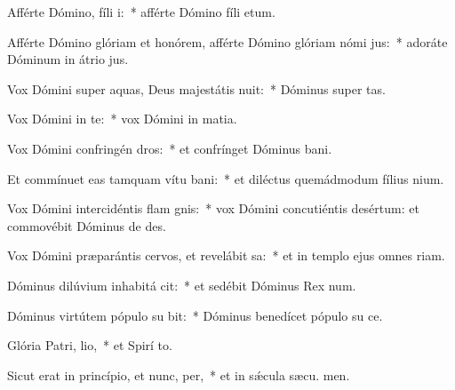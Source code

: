 \item Afférte Dómino, fíli i:~* afférte Dómino fíli etum.
\item Afférte Dómino glóriam et honórem, afférte Dómino glóriam nómi jus:~* adoráte Dóminum in átrio  jus.
\item Vox Dómini super aquas, Deus majestátis nuit:~* Dóminus super  tas.
\item Vox Dómini in te:~* vox Dómini in matia.
\item Vox Dómini confringén dros:~* et confrínget Dóminus  bani.
\item Et commínuet eas tamquam vítu bani:~* et diléctus quemádmodum fílius nium.
\item Vox Dómini intercidéntis flam gnis:~* vox Dómini concutiéntis desértum: et commovébit Dóminus de des.
\item Vox Dómini præparántis cervos, et revelábit sa:~* et in templo ejus omnes  riam.
\item Dóminus dilúvium inhabitá cit:~* et sedébit Dóminus Rex  num.
\item Dóminus virtútem pópulo su bit:~* Dóminus benedícet pópulo su  ce.
\item Glória Patri,  lio,~* et Spirí to.
\item Sicut erat in princípio, et nunc,  per,~* et in sǽcula sæcu. men.
